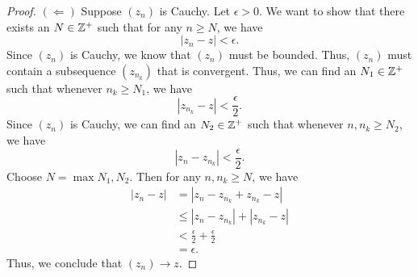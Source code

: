 \documentclass[a4paper]{article}
\begin{document}
\begin{proof}
\( ( \Leftarrow )  \) Suppose \( ({z}_{n}) \) is Cauchy. Let \( \epsilon > 0  \). We want to show that there exists an \( N \in \mathbb{Z}^{+}  \) such that for any \( n \geq N  \), we have  
\[  |  {z}_{n} -  z | < \epsilon. \]
Since \( ({z}_{n}) \) is Cauchy, we know that \( ({z}_{n}) \) must be bounded. Thus, \( ({z}_{n}) \) must contain a subsequence \( ({z}_{{n}_{k }}) \) that is convergent. Thus, we can find an \( {N}_{1} \in \mathbb{Z}^{+}  \) such that whenever \( {n}_{k } \geq {N}_{1}  \), we have 
\[  | {z}_{{n}_{k }} - z  | < \frac{ \epsilon  }{  2  } \tag{3}.  \]
Since \( ({z}_{n}) \) is Cauchy, we can find an \( {N}_{2} \in \mathbb{Z}^{+} \) such that whenever \( n, {n}_{k} \geq {N}_{2} \), we have
\[  |  {z}_{n} - {z}_{{n}_{k}} |  < \frac{ \epsilon  }{ 2 }  \tag{4}. \]
Choose \( N = \max{{N}_{1}, {N}_{2}} \). Then for any \( n, {n}_{k} \geq N  \), we have
\begin{align*}
    | {z}_{n} - z |  &= | {z}_{n} - {z}_{{n}_{k }} + {z}_{{n}_{k }} - z   |  \\
                     &\leq  | {z}_{n} - {z}_{{n}_{k }} |  + | {z}_{{n}_{k }} - z  |  \\
                     &< \frac{ \epsilon  }{ 2  }  + \frac{ \epsilon  }{  2  } \\
                     &= \epsilon.
\end{align*}
Thus, we conclude that \( ({z}_{n}) \to z \).
\end{proof}
\end{document}
